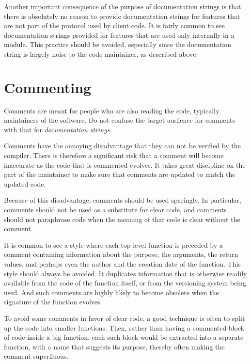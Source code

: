 Another important consequence of the purpose of documentation strings
is that there is absolutely no reason to provide documentation strings
for features that are not part of the protocol used by client code.
It is fairly common to see documentation strings provided for features
that are used only internally in a module.  This practice should be
avoided, especially since the documentation string is largely noise to
the code maintainer, as described above.

\section{Commenting}
\label{sec-general-coding-style-commenting}

Comments are meant for people who are also reading the code, typically
maintainers of the software.  Do not confuse the target audience for
comments with that for \emph{documentation strings}

Comments have the annoying disadvantage that they can not be verified
by the compiler.  There is therefore a significant risk that a comment
will become inaccurate as the code that is commented evolves.  It
takes great discipline on the part of the maintainer to make sure that
comments are updated to match the updated code.

Because of this disadvantage, comments should be used sparingly.  In
particular, comments should not be used as a substitute for clear
code, and comments should not paraphrase code when the meaning of that
code is clear without the comment.

It is common to see a style where each top-level function is preceded
by a comment containing information about the purpose, the arguments,
the return values, and perhaps even the author and the creation date
of the function.  This style should always be avoided.  It duplicates
information that is otherwise readily available from the code of the
function itself, or from the versioning system being used.  And such
comments are highly likely to become obsolete when the signature of
the function evolves.

To avoid some comments in favor of clear code, a good technique is
often to split up the code into smaller functions.  Then, rather than
having a commented block of code inside a big function, each such
block would be extracted into a separate function, with a name that
suggests its purpose, thereby often making the comment superfluous.

